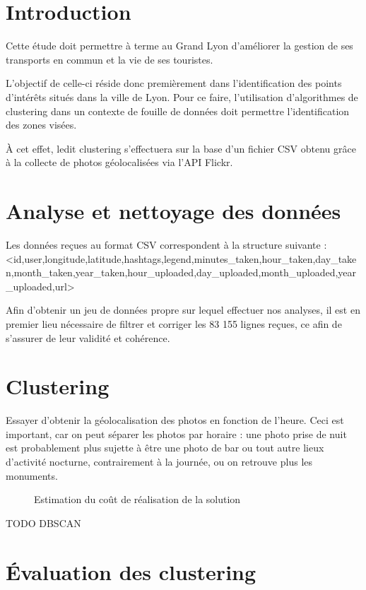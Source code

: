 \section{Introduction}
Cette étude doit permettre à terme au Grand Lyon d'améliorer la gestion de ses transports en commun et la vie de ses touristes.

L'objectif de celle-ci réside donc premièrement dans l'identification des points d'intérêts situés dans la ville de Lyon. Pour ce faire, l'utilisation d'algorithmes de clustering dans un contexte de fouille de données doit permettre l'identification des zones visées.

À cet effet, ledit clustering s'effectuera sur la base d'un fichier CSV obtenu grâce à la collecte de photos géolocalisées via l'API Flickr.
\pagebreak


\section{Analyse et nettoyage des données}
Les données reçues au format CSV correspondent à la structure suivante :
<id,user,longitude,latitude,hashtags,legend,minutes_taken,hour_taken,day_taken,month_taken,year_taken,hour_uploaded,day_uploaded,month_uploaded,year_uploaded,url>

Afin d'obtenir un jeu de données propre sur lequel effectuer nos analyses, il est en premier lieu nécessaire de filtrer et corriger les 83 155 lignes reçues, ce afin de s’assurer de leur validité et cohérence.
\pagebreak


\section{Clustering}
Essayer d’obtenir la géolocalisation des photos en fonction de l’heure. Ceci est important, car on peut séparer les photos par horaire : une photo prise de nuit est probablement plus sujette à être une photo de bar ou tout autre lieux d’activité nocturne, contrairement à la journée, ou on retrouve plus les monuments.
\pagebreak


\begin{figure}[h!]
    \centering
    \caption{Estimation du coût de réalisation de la solution}
\end{figure}

TODO DBSCAN
\pagebreak


\section{Évaluation des clustering}
\pagebreak



